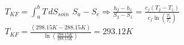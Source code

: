 \( T_{KF} = \int_{a}^{b} T \, dS_{soin} \)  
\( S_a - S_e \Rightarrow \frac{h_2 - h_1}{S_2 - S_1} = \frac{c_f (T_2 - T_1)}{c_f \ln \left( \frac{T_2}{T_1} \right)} \)  
\( T_{KF} = \frac{(298.15K - 288.15K)}{\ln \left( \frac{298.15K}{288.15K} \right)} = 293.12K \)